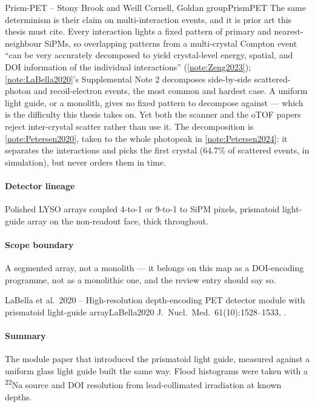 \begin{programnote}{Prism-PET -- Stony Brook and Weill Cornell, Goldan group}{PrismPET}
The same determinism is their claim on multi-interaction events, and it is
prior art this thesis must cite. Every interaction lights a fixed pattern of
primary and nearest-neighbour SiPMs, so overlapping patterns from a
multi-crystal Compton event ``can be very accurately decomposed to yield
crystal-level energy, spatial, and DOI information of the individual
interactions'' (\ref{note:Zeng2023}); \ref{note:LaBella2020}'s Supplemental
Note 2 decomposes side-by-side scattered-photon and recoil-electron events,
the most common and hardest case. A uniform light guide, or a monolith, gives
no fixed pattern to decompose against --- which is the difficulty this thesis
takes on. Yet both the scanner and the oTOF papers reject inter-crystal
scatter rather than use it.
The decomposition is \ref{note:Petersen2020}, taken to the whole photopeak in
\ref{note:Petersen2024}: it separates the interactions and picks the first
crystal (64.7\% of scattered events, in simulation), but never orders them in
time.

\paragraph{Detector lineage}
Polished LYSO arrays coupled 4-to-1 or 9-to-1 to 
SiPM pixels, prismatoid light-guide array on the non-readout face, 
thick throughout.

\paragraph{Scope boundary}
A segmented array, not a monolith --- it belongs on this map as a DOI-encoding
programme, not as a monolithic one, and the review entry should say so.

\begin{papernote}{LaBella et al.\ 2020 -- High-resolution depth-encoding PET detector module with prismatoid light-guide array}{LaBella2020}
J.\ Nucl.\ Med.\ 61(10):1528--1533, .

\paragraph{Summary}
The module paper that introduced the prismatoid light guide, measured against a
uniform glass light guide built the same way. Flood histograms were taken with
a  \textsuperscript{22}Na source and DOI resolution from lead-collimated
irradiation at known depths.


\end{papernote}
\end{programnote}
